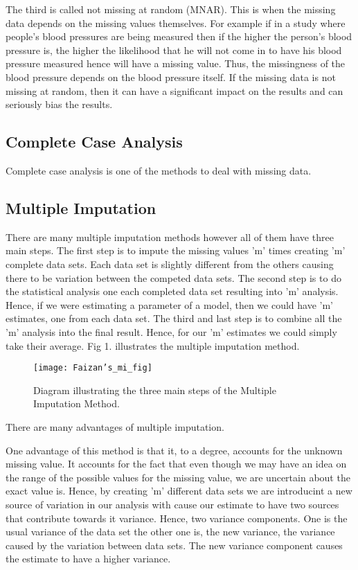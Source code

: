 \documentclass[fleqn,10pt]{wlscirep}\usepackage[]{graphicx}\usepackage[]{color}
\begin{document}
The third is called not missing at random (MNAR). This is when the missing data depends on the missing values themselves. For example if in a study where people's blood pressures are being measured then if the higher the person's blood pressure is, the higher the likelihood that he will not come in to have his blood pressure measured hence will have a missing value. Thus, the missingness of the blood pressure depends on the blood pressure itself. If the missing data is not missing at random, then it can have a significant impact on the results and can seriously bias the results. 

\subsection{Complete Case Analysis}

Complete case analysis is one of the methods to deal with missing data. 

\subsection{Multiple Imputation}

There are many multiple imputation methods however all of them have three main steps. The first step is to impute the missing values 'm' times creating 'm' complete data sets. Each data set is slightly different from the others causing there to be variation between the competed data sets. The second step is to do the statistical analysis one each completed data set resulting into 'm' analysis. Hence, if we were estimating a parameter of a model, then we could have 'm' estimates, one from each data set. The third and last step is to combine all the 'm' analysis into the final result. Hence, for our 'm' estimates we could simply take their average. Fig 1. illustrates the multiple imputation method. 


\begin{figure}[H]
\centering
\texttt{[image: Faizan's\_mi\_fig]}
\caption{Diagram illustrating the three main steps of the Multiple Imputation Method.}
\label{fig:Faizan's_mi_fig}
\end{figure}

There are many advantages of multiple imputation.

One advantage of this method is that it, to a degree, accounts for the unknown missing value. It accounts for the fact that even though we may have an idea on the range of the possible values for the missing value, we are uncertain about the exact value is. Hence, by creating 'm' different data sets we are introducint a new source of variation in our analysis with cause our estimate to have two sources that contribute towards it variance. Hence, two variance components. One is the usual variance of the data set the other one is, the new variance, the variance caused by the variation between data sets. The new variance component causes the estimate to have a higher variance. 
\end{document}
